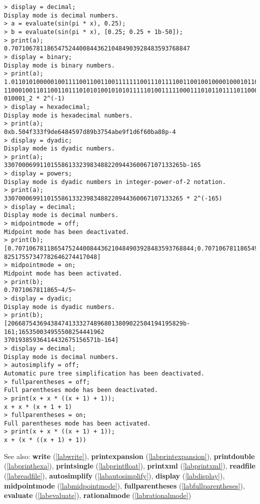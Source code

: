 \begin{center}\begin{minipage}{15cm}\begin{Verbatim}[frame=single]
> display = decimal;
Display mode is decimal numbers.
> a = evaluate(sin(pi * x), 0.25);
> b = evaluate(sin(pi * x), [0.25; 0.25 + 1b-50]);
> print(a);
0.70710678118654752440084436210484903928483593768847
> display = binary;
Display mode is binary numbers.
> print(a);
1.011010100000100111100110011001111111001110111100110010010000100010110010111110
11000100110110011011101010100101010111110100111110001110101101111011000001011101
010001_2 * 2^(-1)
> display = hexadecimal;
Display mode is hexadecimal numbers.
> print(a);
0xb.504f333f9de6484597d89b3754abe9f1d6f60ba88p-4
> display = dyadic;
Display mode is dyadic numbers.
> print(a);
33070006991101558613323983488220944360067107133265b-165
> display = powers;
Display mode is dyadic numbers in integer-power-of-2 notation.
> print(a);
33070006991101558613323983488220944360067107133265 * 2^(-165)
> display = decimal;
Display mode is decimal numbers.
> midpointmode = off;
Midpoint mode has been deactivated.
> print(b);
[0.70710678118654752440084436210484903928483593768844;0.707106781186549497437217
82517557347782646274417048]
> midpointmode = on;
Midpoint mode has been activated.
> print(b);
0.7071067811865~4/5~
> display = dyadic;
Display mode is dyadic numbers.
> print(b);
[2066875436943847413332748968013809022504194195829b-161;165350034955508254441962
37019385936414432675156571b-164]
> display = decimal;
Display mode is decimal numbers.
> autosimplify = off;
Automatic pure tree simplification has been deactivated.
> fullparentheses = off;
Full parentheses mode has been deactivated.
> print(x + x * ((x + 1) + 1));
x + x * (x + 1 + 1)
> fullparentheses = on;
Full parentheses mode has been activated.
> print(x + x * ((x + 1) + 1));
x + (x * ((x + 1) + 1))
\end{Verbatim}
\end{minipage}\end{center}
See also: \textbf{write} (\ref{labwrite}), \textbf{printexpansion} (\ref{labprintexpansion}), \textbf{printdouble} (\ref{labprinthexa}), \textbf{printsingle} (\ref{labprintfloat}), \textbf{printxml} (\ref{labprintxml}), \textbf{readfile} (\ref{labreadfile}), \textbf{autosimplify} (\ref{labautosimplify}), \textbf{display} (\ref{labdisplay}), \textbf{midpointmode} (\ref{labmidpointmode}), \textbf{fullparentheses} (\ref{labfullparentheses}), \textbf{evaluate} (\ref{labevaluate}), \textbf{rationalmode} (\ref{labrationalmode})
